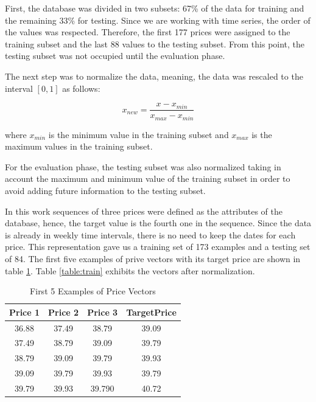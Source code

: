 First, the database was divided in two subsets: 67\% of the data for training and the remaining 33\% for testing. Since we are working with time series, the order of the values was respected. Therefore, the first 177 prices were assigned to the training subset and the last 88 values to the testing subset. From this point, the testing subset was not occupied until the evaluation phase.

The next step was to normalize the data, meaning, the data was rescaled to the interval $[0,1]$ as follows:

\begin{equation}
\label{eq:normalize}
x_{new}=\frac{x-x_{min}}{x_{max}-x_{min}}
\end{equation}

where $x_{min}$ is the minimum value in the training subset and $x_{max}$ is the maximum values in the training subset. 

For the evaluation phase, the testing subset was also normalized taking in account the maximum and minimum value of the training subset in order to avoid adding future information to the testing subset.

In this work sequences of three prices were defined as the attributes of the database, hence, the target value is the fourth one in the sequence. Since the data is already in weekly time intervals, there is no need to keep the dates for each price. This representation gave us a training set of 173 examples and a testing set of 84. The first five examples of prive vectors with its target price are shown in table \ref{table:trainPrices}. Table \ref{table:train} exhibits the vectors after normalization.


\begin{table}{}
\begin{center}
\begin{tabular}{ c | c | c | c }
    \hline
     \textbf{Price 1} &  \textbf{Price 2} &    \textbf{Price 3} &   \textbf{TargetPrice}\\ \hline
    36.88&  37.49&  38.79 &39.09\\ \hline
    37.49&  38.79&  39.09&39.79\\ \hline
    38.79&  39.09&  39.79&39.93\\ \hline
   39.09&  39.79&  39.93&39.79\\ \hline
    39.79&  39.93&  39.790&40.72\\ \hline
    \hline
  \end{tabular}
\caption{First 5 Examples of Price Vectors}
 \label{table:trainPrices}
\end{center}

 \end{table}


